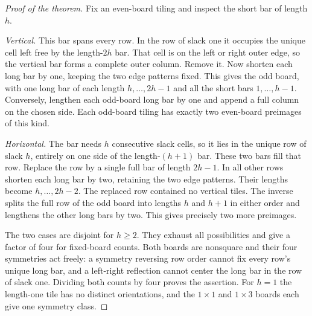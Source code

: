 \documentclass[11pt,letterpaper]{article}
\begin{document}
\begin{proof}[Proof of the theorem]
Fix an even-board tiling and inspect the short bar of length $h$.

\emph{Vertical.} This bar spans every row. In the row of slack one it occupies the unique cell left free by the length-$2h$ bar. That cell is on the left or right outer edge, so the vertical bar forms a complete outer column. Remove it. Now shorten each long bar by one, keeping the two edge patterns fixed. This gives the odd board, with one long bar of each length $h,\ldots,2h-1$ and all the short bars $1,\ldots,h-1$. Conversely, lengthen each odd-board long bar by one and append a full column on the chosen side. Each odd-board tiling has exactly two even-board preimages of this kind.

\emph{Horizontal.} The bar needs $h$ consecutive slack cells, so it lies in the unique row of slack $h$, entirely on one side of the length-$(h+1)$ bar. These two bars fill that row. Replace the row by a single full bar of length $2h-1$. In all other rows shorten each long bar by two, retaining the two edge patterns. Their lengths become $h,\ldots,2h-2$. The replaced row contained no vertical tiles. The inverse splits the full row of the odd board into lengths $h$ and $h+1$ in either order and lengthens the other long bars by two. This gives precisely two more preimages.

The two cases are disjoint for $h\ge2$. They exhaust all possibilities and give a factor of four for fixed-board counts. Both boards are nonsquare and their four symmetries act freely: a symmetry reversing row order cannot fix every row's unique long bar, and a left-right reflection cannot center the long bar in the row of slack one. Dividing both counts by four proves the assertion. For $h=1$ the length-one tile has no distinct orientations, and the $1\times1$ and $1\times3$ boards each give one symmetry class.
\end{proof}
\end{document}
